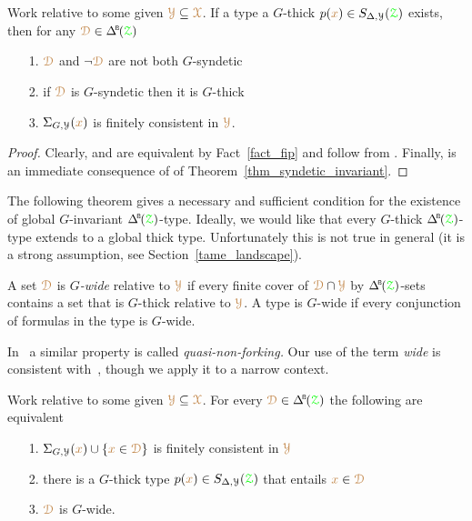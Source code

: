\begin{corollary}\label{corol_def_mu}
  Work relative to some given ${\color{brown}\EuScript Y}\subseteq{\color{brown}\EuScript X}$.
  If a type a $G$-thick $p({\color{brown} x})\in S_{\Delta,\EuScript Y}({\color{green}\EuScript Z})$ exists, then for any $\mrD\in\BDelta({\grZ})$
  \begin{itemize}
    \item[1.] ${\color{brown}\EuScript D}$ and $\neg{\color{brown}\EuScript D}$ are not both $G$-syndetic
    \item[2.] if ${\color{brown}\EuScript D}$ is $G$-syndetic then it is $G$-thick
    \item[3.] $\Sigma_{G,\EuScript Y}({\color{brown} x})$ is finitely consistent in ${\color{brown}\EuScript Y}$.\smallskip
  \end{itemize}
\end{corollary}

\begin{proof}
  Clearly,  and  are equivalent by Fact~\ref{fact_fip} and follow from .
  Finally,  is an immediate consequence of  of Theorem~\ref{thm_syndetic_invariant}.
\end{proof}

The following theorem gives a necessary and sufficient condition for the  existence of global $G$-invariant $\BDelta({\grZ})$-type.
Ideally, we would like that every $G$-thick $\BDelta({\grZ})$-type extends to a global thick type.
Unfortunately this is not true in general (it is a strong assumption, see Section~\ref{tame_landscape}).

A set ${\color{brown}\EuScript D}$ is \emph{$G$-wide\/} relative to ${\color{brown}\EuScript Y}$ if every finite cover of ${\color{brown}\EuScript D}\cap{\color{brown}\EuScript Y}$ by $\BDelta({\grZ})$-sets contains a set that is $G$-thick relative to ${\color{brown}\EuScript Y}$.
A type is $G$-wide if every conjunction of formulas in the type is $G$-wide.

In~\cite{CK} a similar property is called \textit{quasi-non-forking.}
Our use of the term \textit{wide\/} is consistent with~\cite{Hr}, though we apply it to a narrow context.

\begin{theorem}\label{thm_syndetic_invariant2}
  Work relative to some given ${\color{brown}\EuScript Y}\subseteq{\color{brown}\EuScript X}$.
  For every $\mrD\in\BDelta(\grZ)$ the following are equivalent 
  \begin{itemize}
    \item[1.] $\Sigma_{G,\EuScript Y}({\color{brown} x})\cup\{{\color{brown} x}\in{\color{brown}\EuScript D}\}$ is finitely consistent in ${\color{brown}\EuScript Y}$
    \item[2.] there is a $G$-thick type $p({\color{brown} x})\in S_{\Delta,\EuScript Y}({\color{green}\EuScript Z})$ that entails ${\color{brown} x}\in{\color{brown}\EuScript D}$
    \item[3.] ${\color{brown}\EuScript D}$ is $G$-wide.\smallskip
  \end{itemize}
\end{theorem}

